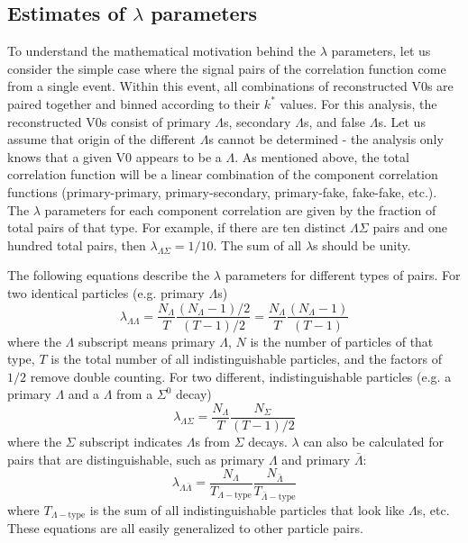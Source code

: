 
\subsection{Estimates of $\lambda$ parameters}
\label{sec:LambdaParams}
To understand the mathematical motivation behind the $\lambda$ parameters, let us consider the simple case where the signal pairs of the correlation function come from a single event.  Within this event, all combinations of reconstructed V0s are paired together and binned according to their $k^*$ values.  For this analysis, the reconstructed V0s consist of primary $\Lambda$s, secondary $\Lambda$s, and false $\Lambda$s.  Let us assume that origin of the different $\Lambda$s cannot be determined - the analysis only knows that a given V0 appears to be a $\Lambda$.  As mentioned above, the total correlation function will be a linear combination of the component correlation functions (primary-primary, primary-secondary, primary-fake, fake-fake, etc.).  The $\lambda$ parameters for each component correlation are given by the fraction of total pairs of that type.  For example, if there are ten distinct $\Lambda\Sigma$ pairs and one hundred total pairs, then $\lambda_{\Lambda\Sigma} = 1/10$.  The sum of all $\lambda$s should be unity.

The following equations describe the $\lambda$ parameters for different types of pairs.  For two identical particles (e.g. primary $\Lambda$s) \begin{equation}
\label{eq:LambdaIdentical}
\lambda_{\Lambda\Lambda} = \frac{N_\Lambda}{T}\frac{(N_\Lambda -1)/2}{(T-1)/2} = \frac{N_\Lambda}{T}\frac{(N_\Lambda -1)}{(T-1)}
\end{equation}
where the $\Lambda$ subscript means primary $\Lambda$, $N$ is the number of particles of that type, $T$ is the total number of all indistinguishable particles, and the factors of $1/2$ remove double counting.  For two different, indistinguishable particles (e.g. a primary $\Lambda$ and a $\Lambda$ from a $\Sigma^0$ decay)
\begin{equation}
\lambda_{\Lambda\Sigma} = \frac{N_\Lambda}{T} \frac{N_\Sigma}{(T-1)/2}
\end{equation}
where the $\Sigma$ subscript indicates $\Lambda$s from $\Sigma$ decays.  $\lambda$ can also be calculated for pairs that are distinguishable, such as primary $\Lambda$ and primary $\bar{\Lambda}$:
\begin{equation}
\lambda_{\Lambda\bar{\Lambda}} = \frac{N_\Lambda}{T_{\Lambda-\mathrm{type}}} \frac{N_{\bar{\Lambda}}}{T_{\bar{\Lambda}-\mathrm{type}}}
\end{equation}
where $T_{\Lambda-\mathrm{type}}$ is the sum of all indistinguishable particles that look like $\Lambda$s, etc.  These equations are all easily generalized to other particle pairs.

